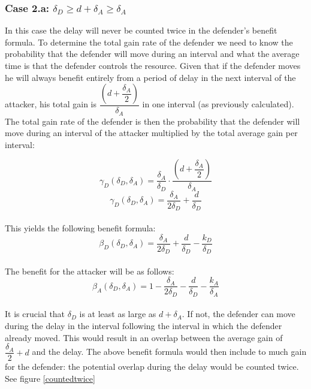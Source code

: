 \subsubsection*{\textbf{Case 2.a:} $ \delta_{D} \geq d + \delta_{A} \geq \delta_{A}$}
In this case the delay will never be counted twice in the defender's  benefit formula. To determine the total gain rate of the defender we need to know the probability that the defender will move during an interval and what the average time is that the defender controls the resource. Given that if the defender moves he will always benefit entirely from a period of delay in the next interval of the attacker, his total gain is $\dfrac{(d+\dfrac{\delta_{A}}{2})}{\delta_{A}}$ in one interval (as previously calculated). The total gain  rate of the defender is then the probability that the defender will move during an interval of the attacker multiplied by the total average gain per interval: 

\begin{equation*}\label{first}
\gamma_{D}(\delta_{D},\delta_{A}) = \dfrac{\delta_{A}}{\delta_{D}} \cdot \dfrac{(d+\dfrac{\delta_{A}}{2})}{\delta_{A}} 
\end{equation*}
\begin{equation*}\label{first}
\gamma_{D}(\delta_{D},\delta_{A}) = \dfrac{\delta_{A}}{2\delta_{D}} + \dfrac{d}{\delta_{D}} 
\end{equation*}\\
This yields the following benefit formula:
\begin{equation}\label{benfcase2a:defender}
\beta_{D}(\delta_{D},\delta_{A}) = \dfrac{\delta_{A}}{2\delta_{D}} + \dfrac{d}{\delta_{D}} - \dfrac{k_{D}}{ \delta_{D}}
\end{equation}\\

The benefit for the attacker will be as follows:
\begin{equation}\label{benfcase2a:attacker}
\beta_{A}(\delta_{D},\delta_{A}) = 1 -\dfrac{\delta_{A}}{2\delta_{D}} - \dfrac{d}{\delta_{D}} - \dfrac{k_{A}}{ \delta_{A}}
\end{equation}\\



It is crucial that $ \delta_{D}$ is at least as large as $d + \delta_{A}$. If not, the defender can move during the delay in the interval following the interval in which the defender already moved. This would result in an overlap between the average gain of $\dfrac{\delta_{A}}{2} +d$ and the delay. The above benefit formula would then include to much gain for the defender: the potential overlap during the delay would be counted twice. See figure \ref{countedtwice}\\

